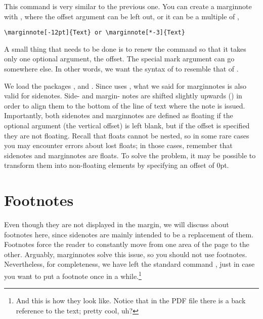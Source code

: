 This command is very similar to the previous one. You can create a 
marginnote with , where the offset 
argument can be left out, or it can be a multiple of 
, 
\eg

\begin{lstlisting}[style=kaolstplain]
\marginnote[-12pt]{Text} or \marginnote[*-3]{Text}
\end{lstlisting}

\begin{kaobox}[frametitle=To Do]
A small thing that needs to be done is to renew the  
command so that it takes only one optional argument, the offset. The 
special mark argument can go somewhere else. In other words, we want the 
syntax of  to resemble that of .
\end{kaobox}

We load the packages ,  and 
. Since  uses , 
what we said for marginnotes is also valid for sidenotes. Side- and 
margin- notes are shifted slightly upwards 
() in 
order to align them to the bottom of the line of text where the note is 
issued. Importantly, both sidenotes and marginnotes are defined as 
floating if the optional argument (\ie the vertical offset) is left 
blank, but if the offset is specified they are not floating. Recall that 
floats cannot be nested, so in some rare cases you may encounter errors 
about lost floats; in those cases, remember that sidenotes and 
marginnotes are floats. To solve the problem, it may be possible to 
transform them into non-floating elements by specifying an offset of 
0pt.

\section{Footnotes}

Even though they are not displayed in the margin, we will discuss about 
footnotes here, since sidenotes are mainly intended to be a replacement 
of them. Footnotes force the reader to constantly move from one area of 
the page to the other. Arguably, marginnotes solve this issue, so you 
should not use footnotes. Nevertheless, for completeness, we have left 
the standard command , just in case you want to put a 
footnote once in a while.\footnote{And this is how they look like. 
Notice that in the PDF file there is a back reference to the text; 
pretty cool, uh?}

